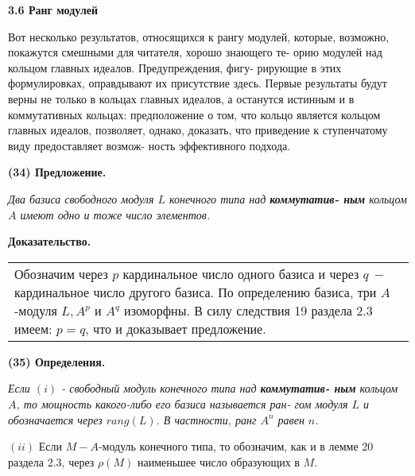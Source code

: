 \documentclass{mai_book}
\begin{document}
	\pagebreak
	
	
	\noindent
	{\large {\bf 3.6 Ранг модулей}}
	
	\noindent
	Вот несколько результатов, относящихся к рангу модулей, которые,\linebreak
	возможно, покажутся смешными для читателя, хорошо знающего те-\linebreak
	орию модулей над кольцом главных идеалов. Предупреждения, фигу-\linebreak
	рирующие в этих формулировках, оправдывают их присутствие здесь.\linebreak
	Первые результаты будут верны не только в кольцах главных идеалов,\linebreak
	а останутся истинным и в коммутативных кольцах: предположение о\linebreak
	том, что кольцо является кольцом главных идеалов, позволяет, однако,\linebreak
	доказать, что приведение к ступенчатому виду предоставляет возмож-\linebreak
	ность эффективного подхода.
	
	\noindent
	{\bf (34) Предложение.}
	
	{\it Два базиса свободного модуля $L$ конечного типа над {\bf коммутатив-\linebreak
	ным} кольцом $A$ имеют одно и тоже число элементов.}
	
	\noindent
	{\bf Доказательство.}
	
	\begin{tabular}{|p{12.5cm}}
	\noindent
	Обозначим через $p$ кардинальное число одного базиса и через $q \ - $\linebreak
	кардинальное число другого базиса. По определению базиса, три\linebreak
	$A$-модуля $L, A^p$ и $A^q$ изоморфны. В силу следствия 19 раздела 2.3\linebreak
	имеем: $p = q$, что и доказывает предложение.
	\end{tabular}
	
	\noindent
	{\bf (35) Определения.}
	
	{\it Если $(i)$ - свободный модуль конечного типа над {\bf коммутатив-\linebreak
	ным} кольцом $A$, то мощность какого-либо его базиса называется ран-\linebreak
	гом модуля $L$ и обозначается через $rang(L)$. В частности, ранг $A^n$ равен\linebreak
	$n$.
	
	$(ii)$ Если $M - A$-модуль конечного типа, то обозначим, как и в\linebreak
	лемме 20 раздела 2.3, через $\rho(M)$ наименьшее число образующих в $M$.}
	
\end{document}
